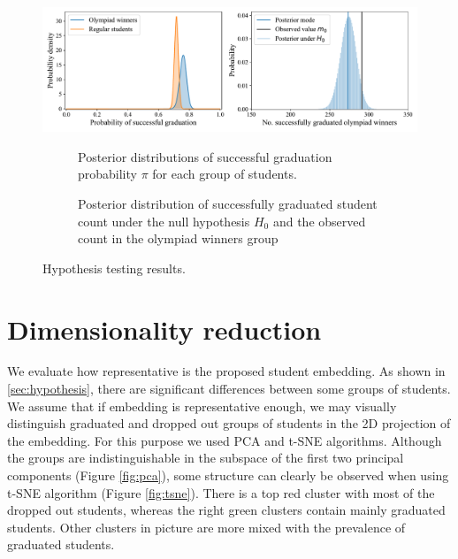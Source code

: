 \documentclass{article}
\begin{document}
\begin{figure}[t!]
  \centering 
  \includegraphics[width=1\linewidth,trim={0.5cm 0 0 0}]{../gfx/testing_fig.pdf}
  \hfill
  \begin{subfigure}{0.48\textwidth}
    \centering
    \caption{Posterior distributions of successful graduation probability $\pi$ for each group of students.}
    \label{fig:test_1}
  \end{subfigure} 
  \hfill
  \begin{subfigure}{0.49\textwidth}
    \centering
    \caption{Posterior distribution of successfully graduated student count under the null hypothesis $H_0$ and the observed count in the olympiad winners group}
  \label{fig:test_2}
  \end{subfigure}
  \hfill
  \captionsetup{belowskip=-15pt}
  \caption{Hypothesis testing results.}
  \label{fig:testing}
  
\end{figure}



\section{Dimensionality reduction}
\label{sec:reduction}
We evaluate how representative is the proposed student embedding. As shown in \ref{sec:hypothesis}, there are significant differences between some groups of students. We assume that if embedding is representative enough, we may visually distinguish graduated and dropped out groups of students in the 2D projection of the embedding. For this purpose we used PCA and t-SNE \cite{van2008visualizing} algorithms. Although the groups are indistinguishable in the subspace of the first two principal components (Figure \ref{fig:pca}), some structure can clearly be observed when using t-SNE algorithm (Figure \ref{fig:tsne}). There is a top red cluster with most of the dropped out students, whereas the right green clusters contain mainly graduated students. Other clusters in picture are more mixed with the prevalence of graduated students.
\end{document}
